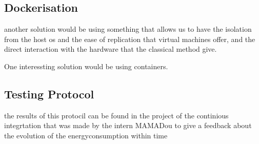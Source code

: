 




\subsection{Dockerisation}
another solution would be using something that allows us to have the isolation from the host os and the ease of replication that virtual machines offer, and the direct interaction with the hardware that the classical method give.

One interessting solution would be using containers.

\subsection{Testing Protocol}
the results of this protocil can be found in the project of the continious integrtation that was made by the intern MAMADou to give a feedback about the evolution of the energyconsumption within time


